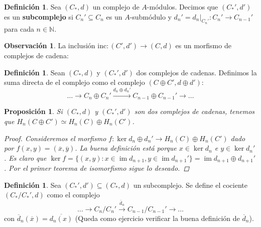 \documentclass[12pt]{book}
\newtheorem{prop}[teo]{Proposición}
\theoremstyle{definition}
\newtheorem{obs}[teo]{Observación}
\newtheorem{defn}[teo]{Definición}
\newcommand{\NN}{\mathbb{N}}
\DeclareMathOperator{\im}{im}
\begin{document}
\begin{defn}
Sea $(C_*,d)$ un complejo de $A$-módulos. Decimos que $(C_*',d')$ es un \textbf{subcomplejo} si $C_n'\subseteq C_n$ es un $A$-submódulo y $d_n' = \left. d_n\right|_{C_n'}:C_n'\to C_{n-1}'$ para cada $n\in\NN$.
\end{defn}

\begin{obs}
La inclusión $\mathrm{inc}:(C',d')\to (C,d)$ es un morfismo de complejos de cadena:
\begin{center}\end{center}
\end{obs}

\begin{defn}
Sean $(C_*,d)$ y $(C_*',d')$ dos complejos de cadenas. Definimos la suma directa de el complejo como el complejo $(C\oplus C',d\oplus d')$: $$\ldots\longrightarrow C_n\oplus C_n'\stackrel{d_n\oplus d_n'}{\longrightarrow} C_{n-1}\oplus C_{n-1}' \longrightarrow\ldots $$
\end{defn}

\begin{prop}
Si $(C_*,d)$ y $(C_*',d')$ son dos complejos de cadenas, tenemos que $H_n(C\oplus C') \simeq H_n(C)\oplus H_n(C')$.
\begin{proof}
Consideremos el morfismo $f: \ker d_n\oplus d_n'\to H_n(C)\oplus H_n(C')$ dado por $f(x,y)=(\overline{x},\overline{y})$. La buena definición está porque $x\in \ker d_n$ e $y\in\ker d_n'$. Es claro que $\ker f = \{(x,y) : x\in\im d_{n+1}, y\in \im d_{n+1}'\} = \im d_{n+1}\oplus d_{n+1}'$. Por el primer teorema de isomorfismo sigue lo deseado.
\end{proof}
\end{prop}

\begin{defn}
Sea $(C_*',d')\subseteq (C_*,d)$ un subcomplejo. Se define el cociente $(C_*/C_*' , d)$ como el complejo $$ \ldots \longrightarrow C_n/C_n' \stackrel{\overline{d}_n}{\longrightarrow} C_{n-1}/C_{n-1}'\longrightarrow \ldots$$ con $\overline{d}_n(\overline{x}) = \overline{d_n(x)}$ (Queda como ejercicio verificar la buena definición de $\overline{d}_n$).
\end{defn}
\end{document}
